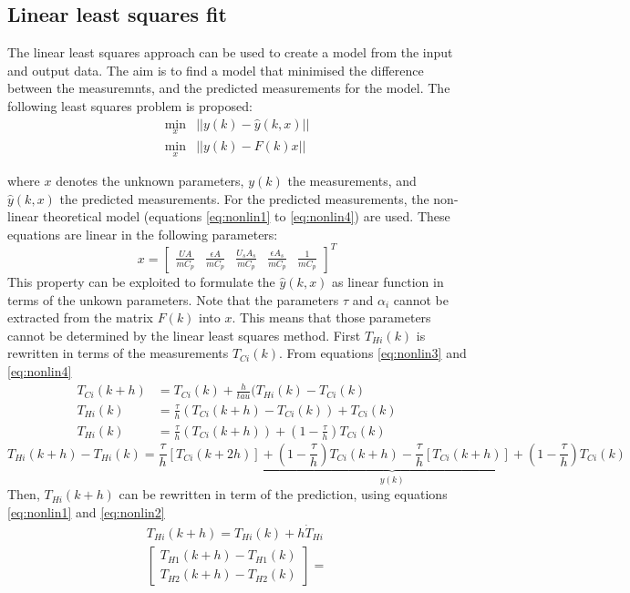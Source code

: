 \subsection{Linear least squares fit}
The linear least squares approach can be used to create a model from the input and output data. The aim is to find a model that minimised the difference between the measuremnts, and the predicted measurements for the model. The following least squares problem is proposed:
\begin{align}
    \displaystyle \min_{x} &||y(k)-\hat{y}(k,x)|| \nonumber \\
    \displaystyle \min_{x} &||y(k)-F(k)x||\label{eq:leastsquarescost}
\end{align}


where $x$ denotes the unknown parameters, $y(k)$ the measurements, and $\hat{y}(k,x)$ the predicted measurements. For the predicted measurements, the non-linear theoretical model (equations \ref{eq:nonlin1} to \ref{eq:nonlin4}) are used. These equations are linear in the following parameters:
$$
x = \begin{bmatrix}
\frac{UA}{mC_p} & \frac{\epsilon A}{mC_p} & \frac{U_sA_s}{mC_p} & \frac{\epsilon A_s}{mC_p} & \frac{1}{mC_p}
\end{bmatrix}^T
$$
This property can be exploited to formulate the $\hat{y}(k,x)$ as linear function in terms of the unkown parameters. Note that the parameters $\tau$ and $\alpha_i$ cannot be extracted from the matrix $F(k)$ into $x$. This means that those parameters cannot be determined by the linear least squares method.
First $T_{Hi}(k)$ is rewritten in terms of the measurements $T_{Ci}(k)$. From equations \ref{eq:nonlin3} and \ref{eq:nonlin4}
\begin{align*}
    T_{Ci}(k+h) &= T_{Ci}(k) + \frac{h}{tau}(T_{Hi}(k) - T_{Ci}(k)\\
    T_{Hi}(k) &= \frac{\tau}{h}(T_{Ci}(k+h) - T_{Ci}(k)) + T_{Ci}(k)\\
    T_{Hi}(k) &= \frac{\tau}{h}(T_{Ci}(k+h)) + (1-\frac{\tau}{h})T_{Ci}(k)
\end{align*}
\begin{equation}
    T_{Hi}(k+h) - T_{Hi}(k) = \underbrace{\frac{\tau}{h}[T_{Ci}(k+2h)] + (1-\frac{\tau}{h})T_{Ci}(k+h) - \frac{\tau}{h}[T_{Ci}(k+h)] + (1-\frac{\tau}{h})T_{Ci}(k)}_{y(k)} \label{eq:leastsquares1}
\end{equation}
Then, $T_{Hi}(k+h)$ can be rewritten in term of the prediction, using equations \ref{eq:nonlin1} and \ref{eq:nonlin2}
\begin{align*}
    T_{Hi}(k+h) = T_{Hi}(k) + h\dot{T}_{Hi}\\
    \begin{bmatrix}
        T_{H1}(k+h) - T_{H1}(k) \\
        T_{H2}(k+h) - T_{H2}(k)
    \end{bmatrix} = 
\end{align*}
